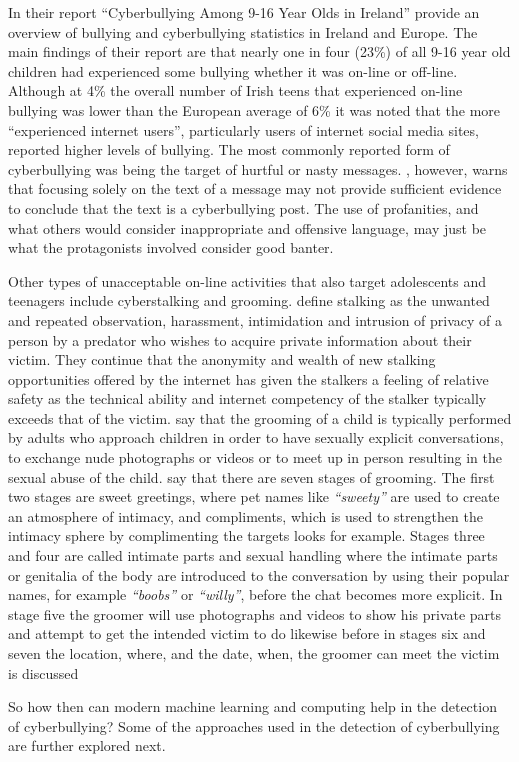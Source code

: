 In their report ``Cyberbullying Among 9-16 Year Olds in Ireland'' \citet{oneill_cyberbullying_2013} provide an overview of bullying and cyberbullying statistics in Ireland and Europe. The main findings of their report are that nearly one in four (23\%) of all 9-16 year old children had experienced some bullying whether it was on-line or off-line. Although at 4\% the overall number of Irish teens that experienced on-line bullying was lower than the European average of 6\% it was noted that the more ``experienced internet users'', particularly users of internet social media sites, reported higher levels of bullying. The most commonly reported form of cyberbullying was being the target of hurtful or nasty messages. \citet{dadvar_towards_2012}, however, warns that focusing solely on the text of a message may not provide sufficient evidence to conclude that the text is a cyberbullying post. The use of profanities, and what others would consider inappropriate and offensive language, may just be what the protagonists involved consider good banter.

Other types of unacceptable on-line activities that also target adolescents and teenagers include cyberstalking and grooming. \citet{aggarwal_anti-cyberstalking:_2005} define stalking as the unwanted and repeated observation, harassment, intimidation and intrusion of privacy of a person by a predator who wishes to acquire private information about their victim. They continue that the anonymity and wealth of new stalking opportunities offered by the internet has given the stalkers a feeling of relative safety as the technical ability and internet competency of the stalker typically exceeds that of the victim. \citet{rybnicek_facebook_2013} say that the grooming of a child is typically performed by adults who approach children in order to have sexually explicit conversations, to exchange nude photographs or videos or to meet up in person resulting in the sexual abuse of the child. \citet{elzinga_analyzing_2012} say that there are seven stages of grooming. The first two stages are sweet greetings, where pet names like \textit{``sweety''} are used to create an atmosphere of intimacy, and compliments, which is used to strengthen the intimacy sphere by complimenting the targets looks for example. Stages three and four are called intimate parts and sexual handling where the intimate parts or genitalia of the body are introduced to the conversation by using their popular names, for example \textit{``boobs''} or \textit{``willy''}, before the chat becomes more explicit. In stage five the groomer will use photographs and videos to show his private parts and attempt to get the intended victim to do likewise before in stages six and seven the location, where, and the date, when, the groomer can meet the victim is discussed

So how then can modern machine learning and computing help in the detection of cyberbullying? Some of the approaches used in the detection of cyberbullying are further explored next.